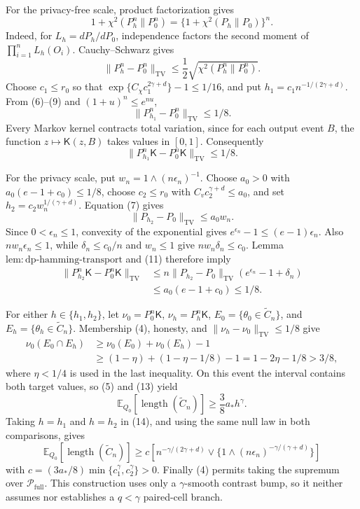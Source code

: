 For the privacy-free scale, product factorization gives
\[
 1+\chi^2(P_h^n\|P_0^n)
 =\{1+\chi^2(P_h\|P_0)\}^n.
\tag{8}
\]
Indeed, for \(L_h=dP_h/dP_0\), independence factors the second moment of \(\prod_{i=1}^nL_h(O_i)\).  Cauchy--Schwarz gives
\[
 \|P_h^n-P_0^n\|_{\mathrm{TV}}
 \le\frac12\sqrt{\chi^2(P_h^n\|P_0^n)}.
\tag{9}
\]
Choose \(c_1\le r_0\) so that \(\exp\{C_\chi c_1^{2\gamma+d}\}-1\le1/16\), and put \(h_1=c_1n^{-1/(2\gamma+d)}\).  From (6)--(9) and \((1+u)^n\le e^{nu}\),
\[
 \|P_{h_1}^n-P_0^n\|_{\mathrm{TV}}\le1/8.
\]
Every Markov kernel contracts total variation, since for each output event \(B\), the function \(z\mapsto\mathsf K(z,B)\) takes values in \([0,1]\).  Consequently
\[
 \|P_{h_1}^n\mathsf K-P_0^n\mathsf K\|_{\mathrm{TV}}\le1/8.
\tag{10}
\]

For the privacy scale, put \(w_n=1\wedge(n\epsilon_n)^{-1}\).  Choose \(a_0>0\) with \(a_0(e-1+c_0)\le1/8\), choose \(c_2\le r_0\) with \(C_vc_2^{\gamma+d}\le a_0\), and set \(h_2=c_2w_n^{1/(\gamma+d)}\).  Equation (7) gives
\[
 \|P_{h_2}-P_0\|_{\mathrm{TV}}\le a_0w_n.
\tag{11}
\]
Since \(0<\epsilon_n\le1\), convexity of the exponential gives \(e^{\epsilon_n}-1\le(e-1)\epsilon_n\).  Also \(nw_n\epsilon_n\le1\), while \(\delta_n\le c_0/n\) and \(w_n\le1\) give \(nw_n\delta_n\le c_0\).  Lemma \(\mathrm{lem{:}dp\text{-}hamming\text{-}transport}\) and (11) therefore imply
\[
 \begin{aligned}
 \|P_{h_2}^n\mathsf K-P_0^n\mathsf K\|_{\mathrm{TV}}
 &\le n\|P_{h_2}-P_0\|_{\mathrm{TV}}
       (e^{\epsilon_n}-1+\delta_n)\\
 &\le a_0(e-1+c_0)\le1/8.
 \end{aligned}
\tag{12}
\]

For either \(h\in\{h_1,h_2\}\), let \(\nu_0=P_0^n\mathsf K\), \(\nu_h=P_h^n\mathsf K\), \(E_0=\{\theta_0\in\widetilde C_n\}\), and \(E_h=\{\theta_h\in\widetilde C_n\}\).  Membership (4), honesty, and \(\|\nu_h-\nu_0\|_{\mathrm{TV}}\le1/8\) give
\[
 \begin{aligned}
 \nu_0(E_0\cap E_h)
 &\ge \nu_0(E_0)+\nu_0(E_h)-1\\
 &\ge(1-\eta)+(1-\eta-1/8)-1
 =1-2\eta-1/8>3/8,
 \end{aligned}
\tag{13}
\]
where \(\eta<1/4\) is used in the last inequality.  On this event the interval contains both target values, so (5) and (13) yield
\[
 \mathbb E_{Q_0}[\operatorname{length}(\widetilde C_n)]
 \ge\frac38a_*h^\gamma.
\tag{14}
\]
Taking \(h=h_1\) and \(h=h_2\) in (14), and using the same null law in both comparisons, gives
\[
 \mathbb E_{Q_0}[\operatorname{length}(\widetilde C_n)]
 \ge c\left[n^{-\gamma/(2\gamma+d)}
 \vee\{1\wedge(n\epsilon_n)^{-\gamma/(\gamma+d)}\}\right]
\]
with \(c=(3a_*/8)\min\{c_1^\gamma,c_2^\gamma\}>0\).  Finally (4) permits taking the supremum over \(\mathcal P_{\mathrm{full}}\).  This construction uses only a \(\gamma\)-smooth contrast bump, so it neither assumes nor establishes a \(q<\gamma\) paired-cell branch.

